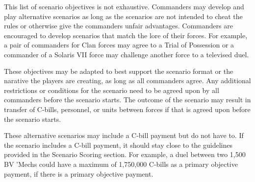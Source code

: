 This list of scenario objectives is not exhaustive.
Commanders may develop and play alternative scenarios as long as the scenarios are not intended to cheat the rules or otherwise give the commanders unfair advantages.
Commanders are encouraged to develop scenarios that match the lore of their forces.
For example, a pair of commanders for Clan forces may agree to a Trial of Possession or a commander of a Solaris VII force may challenge another force to a televised duel.

These objectives may be adapted to best support the scenario format or the narative the players are creating, as long as all commanders agree.
Any additional restrictions or conditions for the scenario need to be agreed upon by all commanders before the scenario starts.
The outcome of the scenario may result in transfer of C-bills, personnel, or units between forces if that is agreed upon before the scenario starts.

These alternative scenarios may include a C-bill payment but do not have to.
If the scenario includes a C-bill payment, it should stay close to the guidelines provided in the Scenario Scoring section.
For example, a duel between two 1,500 BV 'Mechs could have a maximum of 1,750,000 C-bills as a primary objective payment, if there is a primary objective payment.
